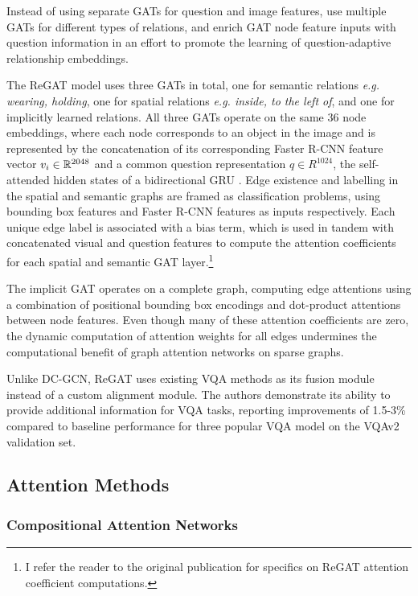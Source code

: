 Instead of using separate GATs for question and image features, \citeauthor{li2019relation} use multiple GATs for different types of relations, and enrich GAT node feature inputs with question information in an effort to promote the learning of question-adaptive relationship embeddings.

The ReGAT model uses three GATs in total, one for semantic relations \textit{e.g. wearing, holding}, one for spatial relations \textit{e.g. inside, to the left of}, and one for implicitly learned relations. All three GATs operate on the same 36 node embeddings, where each node corresponds to an object in the image and is represented by the concatenation of its corresponding Faster R-CNN feature vector \(v_i \in \mathbb{R}^{2048}\) and a common question representation \(q \in R^{1024}\), the self-attended hidden states of a bidirectional GRU \cite{cho2014learning}. Edge existence and labelling in the spatial and semantic graphs are framed as classification problems, using bounding box features and Faster R-CNN features as inputs respectively. Each unique edge label is associated with a bias term, which is used in tandem with concatenated visual and question features to compute the attention coefficients for each spatial and semantic GAT layer.\footnote{I refer the reader to the original publication \cite{li2019relation} for specifics on ReGAT attention coefficient computations.} 

The implicit GAT operates on a complete graph, computing edge attentions using a combination of positional bounding box encodings and dot-product attentions between node features. Even though many of these attention coefficients are zero, the dynamic computation of attention weights for all edges undermines the computational benefit of graph attention networks on sparse graphs.

Unlike DC-GCN, ReGAT uses existing VQA methods as its fusion module instead of a custom alignment module. The authors demonstrate its ability to provide additional information for VQA tasks, reporting improvements of 1.5-3\% compared to baseline performance for three popular VQA model \cite{anderson2018bottom, ben2017mutan, kim2018bilinear} on the VQAv2 validation set.

\subsection{Attention Methods}
\label{subsection:attention_methods_for_vqa}

\subsubsection{Compositional Attention Networks}

